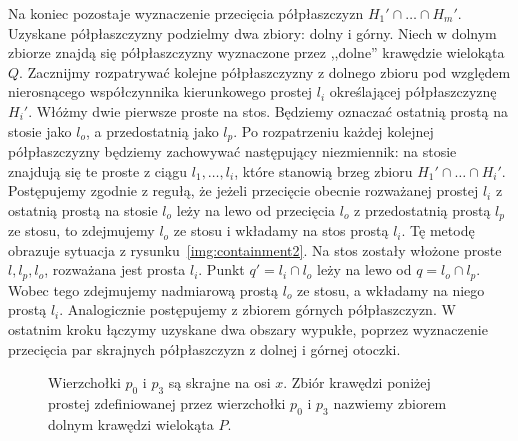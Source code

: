 Na koniec pozostaje wyznaczenie przecięcia półpłaszczyzn $H_1' \cap
\ldots \cap H_m'$. Uzyskane półpłaszczyzny podzielmy dwa zbiory: dolny
i górny. Niech w dolnym zbiorze znajdą się półpłaszczyzny wyznaczone
przez ,,dolne'' krawędzie wielokąta $Q$. Zacznijmy rozpatrywać kolejne
półpłaszczyzny z dolnego zbioru pod względem nierosnącego
współczynnika kierunkowego prostej $l_i$ określającej półpłaszczyznę
$H_i'$. Włóżmy dwie pierwsze proste na stos. Będziemy oznaczać
ostatnią prostą na stosie jako $l_o$, a przedostatnią jako $l_p$. Po
rozpatrzeniu każdej kolejnej półpłaszczyzny będziemy zachowywać
następujący niezmiennik: na stosie znajdują się te proste z ciągu
$l_1, \ldots, l_i$, które stanowią brzeg zbioru $H_1' \cap \ldots \cap
H_i'$. Postępujemy zgodnie z regułą, że jeżeli przecięcie obecnie
rozważanej prostej $l_i$ z ostatnią prostą na stosie $l_o$ leży na
lewo od przecięcia $l_o$ z przedostatnią prostą $l_p$ ze stosu, to
zdejmujemy $l_o$ ze stosu i wkładamy na stos prostą $l_i$. Tę metodę
obrazuje sytuacja z rysunku~\ref{img:containment2}. Na stos zostały
włożone proste $l, l_p, l_o$, rozważana jest prosta $l_i$. Punkt $q' =
l_i \cap l_o$ leży na lewo od $q = l_o \cap l_p$. Wobec tego
zdejmujemy nadmiarową prostą $l_o$ ze stosu, a wkładamy na niego
prostą $l_i$. Analogicznie postępujemy z zbiorem górnych
półpłaszczyzn. W ostatnim kroku łączymy uzyskane dwa obszary wypukłe,
poprzez wyznaczenie przecięcia par skrajnych półpłaszczyzn z dolnej i
górnej otoczki.

\begin{figure}
  \centering
  \caption{\label{fig:lowerpart} Wierzchołki $p_0$ i $p_3$ są skrajne
    na osi $x$. Zbiór krawędzi poniżej prostej zdefiniowanej przez
    wierzchołki $p_0$ i $p_3$ nazwiemy zbiorem dolnym krawędzi
    wielokąta $P$.}
\end{figure}

